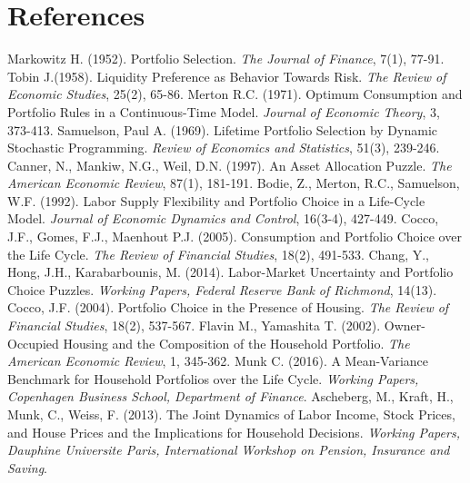 \documentclass[]{elsarticle}
\begin{document}
\section{References}
\begin{thebibliography}{}
 Markowitz H. (1952). Portfolio Selection. \textit{The Journal of Finance}, 7(1), 77-91.
 Tobin J.(1958). Liquidity Preference as Behavior Towards Risk. \textit{The Review of Economic Studies}, 25(2), 65-86.
 Merton R.C. (1971). Optimum Consumption and Portfolio Rules in a Continuous-Time Model. \textit{Journal of Economic Theory}, 3, 373-413.
 Samuelson, Paul A. (1969). Lifetime Portfolio Selection by Dynamic Stochastic Programming. \textit{Review of Economics and Statistics}, 51(3), 239-246.
 Canner, N., Mankiw, N.G., Weil, D.N. (1997). An Asset Allocation Puzzle. \textit{The American Economic Review}, 87(1), 181-191.
Bodie, Z., Merton, R.C., Samuelson, W.F. (1992). Labor Supply Flexibility and Portfolio Choice in a Life-Cycle Model. \textit{Journal of Economic Dynamics and Control}, 16(3-4), 427-449. 
 Cocco, J.F., Gomes, F.J., Maenhout P.J. (2005). Consumption and Portfolio Choice over the Life Cycle. \textit{The Review of Financial Studies}, 18(2), 491-533. 
 Chang, Y., Hong, J.H., Karabarbounis, M. (2014). Labor-Market Uncertainty and Portfolio Choice Puzzles. \textit{Working Papers, Federal Reserve Bank of Richmond}, 14(13).
 Cocco, J.F. (2004). Portfolio Choice in the Presence of Housing. \textit{The Review of Financial Studies}, 18(2), 537-567.
 Flavin M., Yamashita T. (2002). Owner-Occupied Housing and the Composition of the Household Portfolio. \textit{The American Economic Review}, 1, 345-362.
 Munk C. (2016). A Mean-Variance Benchmark for Household Portfolios over the Life Cycle. \textit{Working Papers, Copenhagen Business School, Department of Finance}.
 Ascheberg, M., Kraft, H., Munk, C., Weiss, F. (2013). The Joint Dynamics of Labor Income, Stock Prices, and House Prices and the Implications for Household Decisions. \textit{Working Papers, Dauphine Universite Paris, International Workshop on Pension, Insurance and Saving}.

\end{thebibliography}
\end{document}
